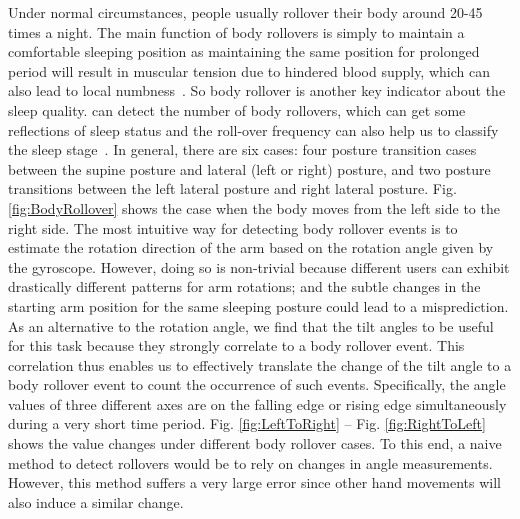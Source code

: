 Under normal circumstances, people usually rollover their body around 20-45 times a night. The main function of body rollovers is simply to
maintain a comfortable sleeping position as maintaining the same position for prolonged period will result in muscular tension due to
hindered blood supply, which can also lead to local numbness~\cite{rollover2014}. So body rollover is another key indicator about the sleep
quality. {\systemname} can detect the number of body rollovers, which can get some reflections of sleep status and the roll-over frequency
can also help us to classify the sleep stage~\cite{rollover2007}. In general, there are six cases: four posture transition cases between
the supine posture and lateral (left or right) posture, and two posture transitions between the left lateral posture and right lateral
posture. Fig. \ref{fig:BodyRollover} shows the case when the body moves from the left side to the right side.
%
The most intuitive way for detecting body rollover events is to estimate the rotation direction of the arm based on the
rotation angle given by the gyroscope. However, doing so is non-trivial because different users can exhibit drastically different patterns
for arm rotations; and the subtle changes in the starting arm position for the same sleeping posture could lead to a misprediction. As an
alternative to the rotation angle, we find that the tilt angles to be useful for this task because they strongly correlate to a body
rollover event. This correlation thus enables us to effectively translate the change of the tilt angle to a body rollover event to count
the occurrence of such events. Specifically, the angle values of three different axes are on the falling edge or rising edge
simultaneously during a very short time period. Fig. \ref{fig:LeftToRight} -- Fig. \ref{fig:RightToLeft} shows the value changes under
different body rollover cases. To this end, a naive method to detect rollovers would be to rely on changes in angle measurements. However,
this method suffers a very large error since other hand movements will also induce a similar change.

